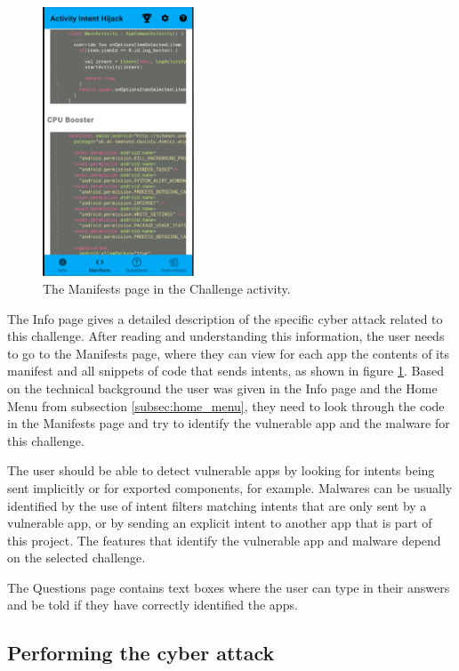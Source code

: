     \begin{figure}
        \centering
        \includegraphics[width=0.4\textwidth]{graphics/manifests.PNG}
        \caption{The Manifests page in the Challenge activity.}
        \label{fig:manifests_fragment}
    \end{figure}
    
    The Info page gives a detailed description of the specific cyber attack related to this challenge. After reading and understanding this information, the user needs to go to the Manifests page, where they can view for each app the contents of its manifest and all snippets of code that sends intents, as shown in figure \ref{fig:manifests_fragment}. Based on the technical background the user was given in the Info page and the Home Menu from subsection \ref{subsec:home_menu}, they need to look through the code in the Manifests page and try to identify the vulnerable app and the malware for this challenge. 
    
    The user should be able to detect vulnerable apps by looking for intents being sent implicitly or for exported components, for example. Malwares can be usually identified by the use of intent filters matching intents that are only sent by a vulnerable app, or by sending an explicit intent to another app that is part of this project. The features that identify the vulnerable app and malware depend on the selected challenge. 
    
    The Questions page contains text boxes where the user can type in their answers and be told if they have correctly identified the apps.
    
    \subsection{Performing the cyber attack}
        \label{subsec:perform_attack}
        
